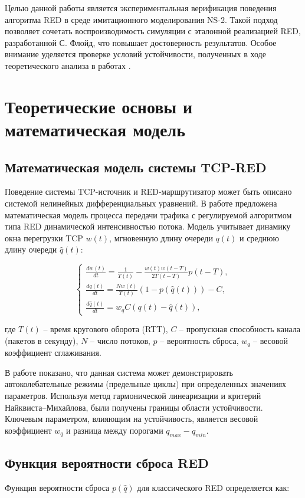 \documentclass[10pt, conference, twocolumn, a4paper]{article}
\begin{document}
Целью данной работы является экспериментальная верификация поведения алгоритма RED в среде имитационного моделирования NS-2. Такой подход позволяет сочетать воспроизводимость симуляции с эталонной реализацией RED, разработанной С. Флойд, что повышает достоверность результатов. Особое внимание уделяется проверке условий устойчивости, полученных в ходе теоретического анализа в работах \cite{velieva2019phd}.

\section{Теоретические основы и математическая модель}
\subsection{Математическая модель системы TCP-RED}
Поведение системы TCP-источник и RED-маршрутизатор может быть описано системой нелинейных дифференциальных уравнений. В работе \cite{korolkova2010phd} предложена математическая модель процесса передачи трафика с регулируемой алгоритмом типа RED динамической интенсивностью потока. Модель учитывает динамику окна перегрузки TCP $w(t)$, мгновенную длину очереди $q(t)$ и среднюю длину очереди $\hat{q}(t)$:

\begin{equation}
\begin{cases}
\frac{dw(t)}{dt} = \frac{1}{T(t)} - \frac{w(t)w(t-T)}{2T(t-T)}p(t-T), \\
\frac{dq(t)}{dt} = \frac{N w(t)}{T(t)} (1 - p(\hat{q}(t))) - C, \\
\frac{d\hat{q}(t)}{dt} = w_q C (q(t) - \hat{q}(t)),
\end{cases}
\label{eq:fluid_model}
\end{equation}

где $T(t)$ -- время кругового оборота (RTT), $C$ -- пропускная способность канала (пакетов в секунду), $N$ -- число потоков, $p$ -- вероятность сброса, $w_q$ -- весовой коэффициент сглаживания.

В работе \cite{velieva2019phd} показано, что данная система может демонстрировать автоколебательные режимы (предельные циклы) при определенных значениях параметров. Используя метод гармонической линеаризации и критерий Найквиста--Михайлова, были получены границы области устойчивости. Ключевым параметром, влияющим на устойчивость, является весовой коэффициент $w_q$ и разница между порогами $q_{max} - q_{min}$.

\subsection{Функция вероятности сброса RED}
Функция вероятности сброса $p(\hat{q})$ для классического RED определяется как:
\end{document}
